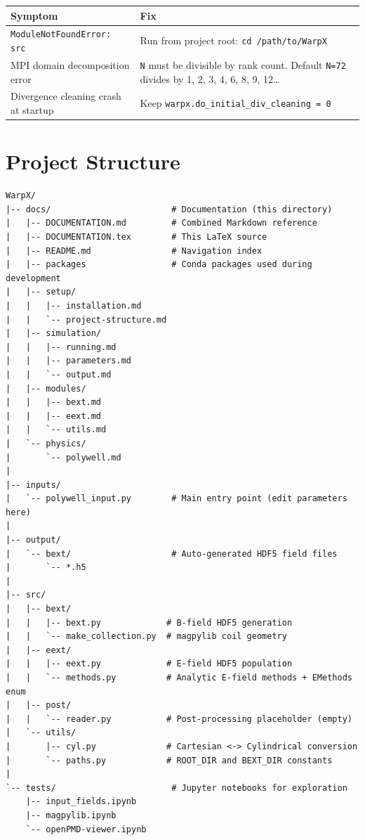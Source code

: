 \documentclass[11pt, a4paper]{article}
\begin{document}
\begin{longtable}{L{5.5cm} L{8cm}}
\toprule
\textbf{Symptom} & \textbf{Fix} \\
\midrule
\texttt{ModuleNotFoundError: src} &
    Run from project root: \texttt{cd /path/to/WarpX} \\[0.3em]
MPI domain decomposition error &
    \texttt{N} must be divisible by rank count. Default \texttt{N=72} divides by
    1, 2, 3, 4, 6, 8, 9, 12\ldots \\[0.3em]
Divergence cleaning crash at startup &
    Keep \texttt{warpx.do\_initial\_div\_cleaning = 0} \\
\bottomrule
\end{longtable}

\section{Project Structure}

\begin{lstlisting}[style=plain, caption={Directory tree}]
WarpX/
|-- docs/                        # Documentation (this directory)
|   |-- DOCUMENTATION.md         # Combined Markdown reference
|   |-- DOCUMENTATION.tex        # This LaTeX source
|   |-- README.md                # Navigation index
|   |-- packages                 # Conda packages used during development
|   |-- setup/
|   |   |-- installation.md
|   |   `-- project-structure.md
|   |-- simulation/
|   |   |-- running.md
|   |   |-- parameters.md
|   |   `-- output.md
|   |-- modules/
|   |   |-- bext.md
|   |   |-- eext.md
|   |   `-- utils.md
|   `-- physics/
|       `-- polywell.md
|
|-- inputs/
|   `-- polywell_input.py        # Main entry point (edit parameters here)
|
|-- output/
|   `-- bext/                    # Auto-generated HDF5 field files
|       `-- *.h5
|
|-- src/
|   |-- bext/
|   |   |-- bext.py             # B-field HDF5 generation
|   |   `-- make_collection.py  # magpylib coil geometry
|   |-- eext/
|   |   |-- eext.py             # E-field HDF5 population
|   |   `-- methods.py          # Analytic E-field methods + EMethods enum
|   |-- post/
|   |   `-- reader.py           # Post-processing placeholder (empty)
|   `-- utils/
|       |-- cyl.py              # Cartesian <-> Cylindrical conversion
|       `-- paths.py            # ROOT_DIR and BEXT_DIR constants
|
`-- tests/                       # Jupyter notebooks for exploration
    |-- input_fields.ipynb
    |-- magpylib.ipynb
    `-- openPMD-viewer.ipynb
\end{lstlisting}
\end{document}

